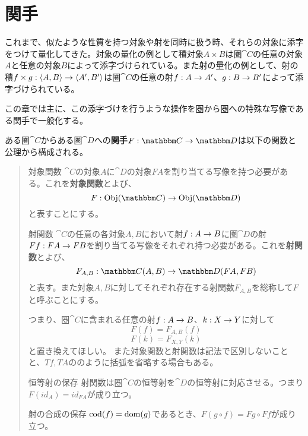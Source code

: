 \section{関手}
  これまで、似たような性質を持つ対象や射を同時に扱う時、それらの対象に添字をつけて量化してきた。対象の量化の例として積対象$A\times B$は圏$\cat{C}$の任意の対象$A$と任意の対象$B$によって添字づけられている。また射の量化の例として、射の積$f\times g:\langle A,B\rangle\rightarrow \langle A',B'\rangle$は圏$\cat{C}$の任意の射$f:A\rightarrow A'$、$g:B\rightarrow B'$によって添字づけられている。

  この章では主に、この添字づけを行うような操作を圏から圏への特殊な写像である関手で一般化する。

	\begin{define}
		ある圏$\cat{C}$からある圏$\cat{D}$への\textbf{関手}$\functor{F}{C}{D}$は以下の関数と公理から構成される。
		\begin{quote}
			\begin{mydescription}
		\item[対象関数]$\cat{C}$の対象$A$に$\cat{D}$の対象$FA$を割り当てる写像を持つ必要がある。これを\textbf{対象関数}とよび、\[\mor{F}{\obj{C}}{\obj{D}}\]と表すことにする。
		\item[射関数]$\cat{C}$の任意の各対象$A,B$において射$f:A\rightarrow B$に圏$\cat{D}$の射$Ff:FA\rightarrow FB$を割り当てる写像をそれぞれ持つ必要がある。これを\textbf{射関数}とよび、\[\mor{F_{A,B}}{\arset{C}{A}{B}}{\arset{D}{FA}{FB}}\]と表す。また対象$A,B$に対してそれぞれ存在する射関数$F_{A,B}$を総称して$F$と呼ぶことにする。

		つまり、圏$\cat{C}$に含まれる任意の射$f:A\rightarrow B$、$k:X\rightarrow Y$に対して\[F(f)=F_{A,B}(f)\]\[F(k)=F_{X,Y}(k)\]と置き換えてほしい。
		また対象関数と射関数は記法で区別しないことと、$Tf,TA$ののように括弧を省略する場合もある。
		\item[恒等射の保存] 射関数は圏$\cat{C}$の恒等射を$\cat{D}$の恒等射に対応させる。つまり$F(id_A)=id_{FA}$が成り立つ。
		\item[射の合成の保存]$\mathrm{cod}(f)=\mathrm{dom}(g)$であるとき、$F(g\circ f)=Fg\circ Ff$が成り立つ。
		\end{mydescription}
		\end{quote}
	\end{define}

